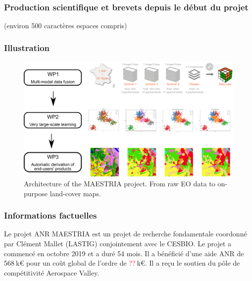 

\subsubsection*{Production scientifique et brevets depuis le début du projet}(environ 500 caractères espaces compris) \\


\subsubsection*{Illustration}
\begin{figure}[h]
    \centering
    \includegraphics[width=0.9\columnwidth]{img/wp_maestria.png}
    \caption{Architecture of the MAESTRIA project. From raw EO data to on-purpose land-cover maps.}
    \label{fig:enter-label}
\end{figure}



\subsubsection*{Informations factuelles}

Le projet ANR MAESTRIA est un projet de recherche fondamentale coordonné par Clément Mallet (LASTIG) conjointement avec le CESBIO. Le projet a commencé en octobre 2019 et a duré 54 mois. Il a bénéficié d’une aide ANR de 568$\:$k€ pour un coût global de l’ordre de \textcolor{red}{??}$\:$k€. Il a reçu le soutien du pôle de compétitivité Aerospace Valley.


